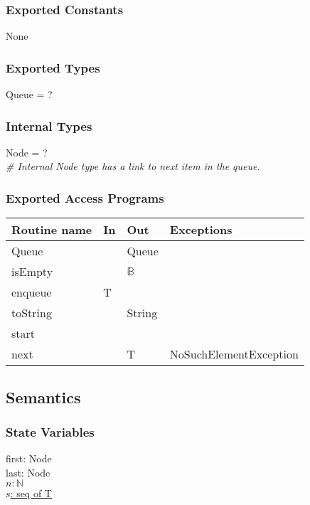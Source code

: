 \documentclass[12pt]{article}
\begin{document}
\subsubsection* {Exported Constants}

None

\subsubsection* {Exported Types}

Queue = ?

\subsubsection* {Internal Types}

Node = ?\\

\noindent \textit{\# Internal Node type has a link to next item in the queue.}

\subsubsection* {Exported Access Programs}

\begin{tabular}{| l | l | l | p{5cm} |}
\hline
\textbf{Routine name} & \textbf{In} & \textbf{Out} & \textbf{Exceptions}\\
\hline
Queue & ~ & Queue & ~\\
\hline
isEmpty & ~ & $\mathbb{B}$ & ~\\
\hline
enqueue & T & ~ & ~\\
\hline
toString & ~ & String & ~\\
\hline
start & ~ & ~ & ~\\
\hline
next & ~ & T & NoSuchElementException\\
\hline
\end{tabular}

\newpage

\subsection* {Semantics}

\subsubsection* {State Variables}

first: Node\\
last: Node\\
$n: \mathbb{N}$\\
\underline{$s$: seq of T}\\
\end{document}
